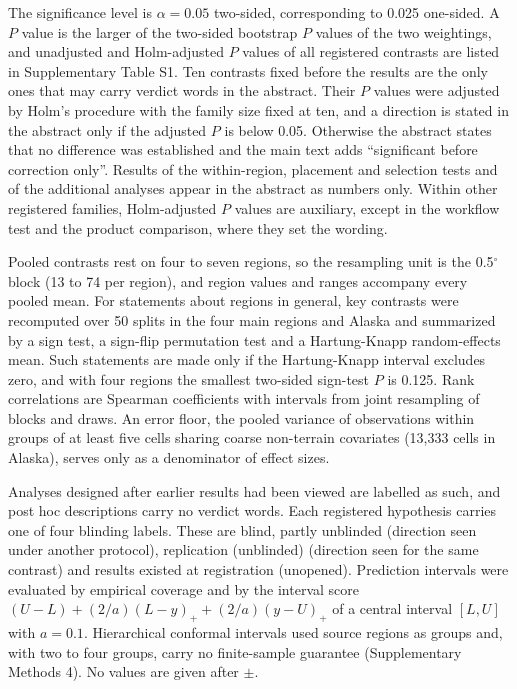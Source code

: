 The significance level is $\alpha = 0.05$ two-sided, corresponding to 0.025 one-sided. A $P$ value is the larger of the two-sided bootstrap $P$ values of the two weightings, and unadjusted and Holm-adjusted $P$ values of all registered contrasts are listed in Supplementary Table S1. Ten contrasts fixed before the results are the only ones that may carry verdict words in the abstract. Their $P$ values were adjusted by Holm's procedure\cite{Holm1979} with the family size fixed at ten, and a direction is stated in the abstract only if the adjusted $P$ is below 0.05. Otherwise the abstract states that no difference was established and the main text adds ``significant before correction only''. Results of the within-region, placement and selection tests and of the additional analyses appear in the abstract as numbers only. Within other registered families, Holm-adjusted $P$ values are auxiliary, except in the workflow test and the product comparison, where they set the wording.

Pooled contrasts rest on four to seven regions, so the resampling unit is the 0.5$^{\circ}$ block (13 to 74 per region), and region values and ranges accompany every pooled mean. For statements about regions in general, key contrasts were recomputed over 50 splits in the four main regions and Alaska and summarized by a sign test, a sign-flip permutation test and a Hartung-Knapp random-effects mean\cite{HartungKnapp2001}. Such statements are made only if the Hartung-Knapp interval excludes zero, and with four regions the smallest two-sided sign-test $P$ is 0.125. Rank correlations are Spearman coefficients with intervals from joint resampling of blocks and draws. An error floor, the pooled variance of observations within groups of at least five cells sharing coarse non-terrain covariates (13,333 cells in Alaska), serves only as a denominator of effect sizes.

Analyses designed after earlier results had been viewed are labelled as such, and post hoc descriptions carry no verdict words. Each registered hypothesis carries one of four blinding labels. These are blind, partly unblinded (direction seen under another protocol), replication (unblinded) (direction seen for the same contrast) and results existed at registration (unopened). Prediction intervals were evaluated by empirical coverage and by the interval score $(U - L) + (2/a)(L - y)_{+} + (2/a)(y - U)_{+}$ of a central interval $[L, U]$ with $a = 0.1$\cite{GneitingRaftery2007}. Hierarchical conformal intervals used source regions as groups\cite{Dunn2023} and, with two to four groups, carry no finite-sample guarantee (Supplementary Methods 4). No values are given after $\pm$.

